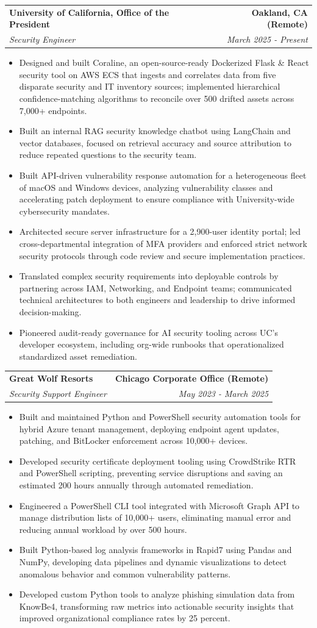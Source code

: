 \documentclass[letterpaper,10pt]{article}
\makeatletter
\newcommand{\resumeCompanySize}{\large}
\newcommand{\resumeMetaSize}{\small}
\newcommand{\resumeBodySize}{\small}
\newcommand{\resumeSubheadingGap}{-2pt}
\newcommand{\resumeListEndGap}{-2pt}
\newcommand{\resumeSectionOutroGap}{6pt}
\renewcommand{\resumeCompanySize}{\normalsize}
\renewcommand{\resumeMetaSize}{\footnotesize}
\renewcommand{\resumeBodySize}{\footnotesize}
\renewcommand{\resumeSubheadingGap}{-3pt}
\renewcommand{\resumeListEndGap}{-4pt}
\renewcommand{\resumeSectionOutroGap}{4pt}
\renewcommand{\resumeSubheadingGap}{-1pt}
\renewcommand{\resumeListEndGap}{-1pt}
\renewcommand{\resumeSectionOutroGap}{8pt}
\newcommand{\resumeItem}[1]{\item{\resumeBodySize #1}}
\newcommand{\resumeItemListStart}{\begin{itemize}}
\newcommand{\resumeItemListEnd}{\end{itemize}\vspace{\resumeListEndGap}}
\newcommand{\resumeSubheading}[4]{%
  \vspace{\resumeSubheadingGap}\item
  \begin{tabular*}{\textwidth}[t]{l@{\extracolsep{\fill}}r}
    \textbf{\resumeCompanySize #1} & \textbf{\resumeMetaSize #2} \\
    \textit{\resumeCompanySize #3} & \textit{\resumeMetaSize #4} \\
  \end{tabular*}\vspace{\resumeSubheadingGap}
}
\makeatother
\begin{document}
\resumeSubheading
  {University of California, Office of the President}{Oakland, CA (Remote)}
  {Security Engineer}{March 2025 - Present}
  \vspace{2pt}
\resumeItemListStart
  \resumeItem{Designed and built Coraline, an open-source-ready Dockerized Flask \& React security tool on AWS ECS that ingests and correlates data from five disparate security and IT inventory sources; implemented hierarchical confidence-matching algorithms to reconcile over 500 drifted assets across 7,000+ endpoints.}
  \resumeItem{Built an internal RAG security knowledge chatbot using LangChain and vector databases, focused on retrieval accuracy and source attribution to reduce repeated questions to the security team.}
  \resumeItem{Built API-driven vulnerability response automation for a heterogeneous fleet of macOS and Windows devices, analyzing vulnerability classes and accelerating patch deployment to ensure compliance with University-wide cybersecurity mandates.}
  \resumeItem{Architected secure server infrastructure for a 2,900-user identity portal; led cross-departmental integration of MFA providers and enforced strict network security protocols through code review and secure implementation practices.}
  \resumeItem{Translated complex security requirements into deployable controls by partnering across IAM, Networking, and Endpoint teams; communicated technical architectures to both engineers and leadership to drive informed decision-making.}
  \resumeItem{Pioneered audit-ready governance for AI security tooling across UC’s developer ecosystem, including org-wide runbooks that operationalized standardized asset remediation.}
  \resumeItemListEnd
\vspace{\resumeSectionOutroGap}

\resumeSubheading
  {Great Wolf Resorts}{Chicago Corporate Office (Remote)}
  {Security Support Engineer}{May 2023 - March 2025}
\vspace{2pt}
\resumeItemListStart
  \resumeItem{Built and maintained Python and PowerShell security automation tools for hybrid Azure tenant management, deploying endpoint agent updates, patching, and BitLocker enforcement across 10,000+ devices.}
  \resumeItem{Developed security certificate deployment tooling using CrowdStrike RTR and PowerShell scripting, preventing service disruptions and saving an estimated 200 hours annually through automated remediation.}
  \resumeItem{Engineered a PowerShell CLI tool integrated with Microsoft Graph API to manage distribution lists of 10,000+ users, eliminating manual error and reducing annual workload by over 500 hours.}
  \resumeItem{Built Python-based log analysis frameworks in Rapid7 using Pandas and NumPy, developing data pipelines and dynamic visualizations to detect anomalous behavior and common vulnerability patterns.}
  \resumeItem{Developed custom Python tools to analyze phishing simulation data from KnowBe4, transforming raw metrics into actionable security insights that improved organizational compliance rates by 25 percent.}
\resumeItemListEnd
\vspace{\resumeSectionOutroGap}
\end{document}
